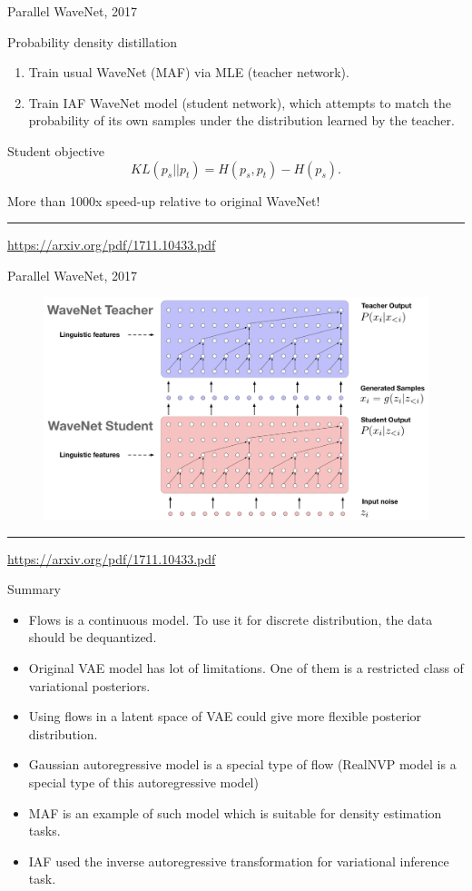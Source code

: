 \documentclass{beamer}
\begin{document}
\begin{frame}{Parallel WaveNet, 2017}
	\begin{block}{Probability density distillation}
		\begin{enumerate}
			\item Train usual WaveNet (MAF) via MLE (teacher network).
			\item Train IAF WaveNet model (student network), which attempts to match the probability of its own samples under the distribution learned by the teacher.
		\end{enumerate}
	\end{block}
	\begin{block}{Student objective}
		\[
		KL(p_s || p_t) = H(p_s, p_t) - H(p_s).
		\]
	\end{block}
	More than 1000x speed-up relative to original WaveNet!
	\vfill
	\hrule\medskip
	{\scriptsize \href{https://arxiv.org/pdf/1711.10433.pdf}{https://arxiv.org/pdf/1711.10433.pdf}}
\end{frame}
\begin{frame}{Parallel WaveNet, 2017}
	\begin{figure}
		\centering
		\includegraphics[width=\linewidth]{figs/parallel_wavenet.png}
	\end{figure}
	\vfill
	\hrule\medskip
	{\scriptsize \href{https://arxiv.org/pdf/1711.10433.pdf}{https://arxiv.org/pdf/1711.10433.pdf}}
\end{frame}
\begin{frame}{Summary}
	\begin{itemize}
		\item Flows is a continuous model. To use it for discrete distribution, the data should be dequantized.
		\item Original VAE model has lot of limitations. One of them is a restricted class of variational posteriors.
		\item Using flows in a latent space of VAE could give more flexible posterior distribution.
		\item Gaussian autoregressive model is a special type of flow (RealNVP model is a special type of this autoregressive model)
		\item MAF is an example of such model which is suitable for density estimation tasks.
		\item  IAF used the inverse autoregressive transformation for variational inference task.
	\end{itemize}
\end{frame}
\end{document}
